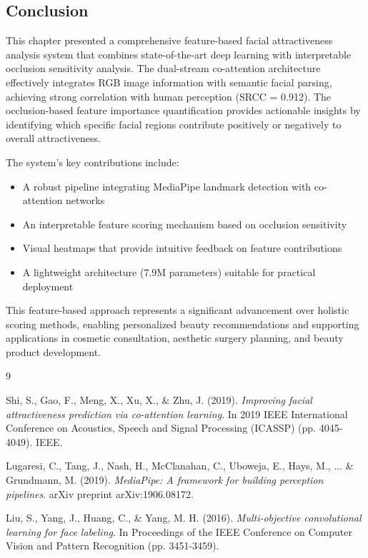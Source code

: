 \subsection{Conclusion}

This chapter presented a comprehensive feature-based facial attractiveness analysis system that combines state-of-the-art deep learning with interpretable occlusion sensitivity analysis. The dual-stream co-attention architecture effectively integrates RGB image information with semantic facial parsing, achieving strong correlation with human perception (SRCC = 0.912). The occlusion-based feature importance quantification provides actionable insights by identifying which specific facial regions contribute positively or negatively to overall attractiveness.

The system's key contributions include:
\begin{itemize}
    \item A robust pipeline integrating MediaPipe landmark detection with co-attention networks
    \item An interpretable feature scoring mechanism based on occlusion sensitivity
    \item Visual heatmaps that provide intuitive feedback on feature contributions
    \item A lightweight architecture (7.9M parameters) suitable for practical deployment
\end{itemize}

This feature-based approach represents a significant advancement over holistic scoring methods, enabling personalized beauty recommendations and supporting applications in cosmetic consultation, aesthetic surgery planning, and beauty product development.

\begin{thebibliography}{9}

Shi, S., Gao, F., Meng, X., Xu, X., \& Zhu, J. (2019).
\textit{Improving facial attractiveness prediction via co-attention learning}.
In 2019 IEEE International Conference on Acoustics, Speech and Signal Processing (ICASSP) (pp. 4045-4049). IEEE.

Lugaresi, C., Tang, J., Nash, H., McClanahan, C., Uboweja, E., Hays, M., ... \& Grundmann, M. (2019).
\textit{MediaPipe: A framework for building perception pipelines}.
arXiv preprint arXiv:1906.08172.

Liu, S., Yang, J., Huang, C., \& Yang, M. H. (2016).
\textit{Multi-objective convolutional learning for face labeling}.
In Proceedings of the IEEE Conference on Computer Vision and Pattern Recognition (pp. 3451-3459).

\end{thebibliography}
